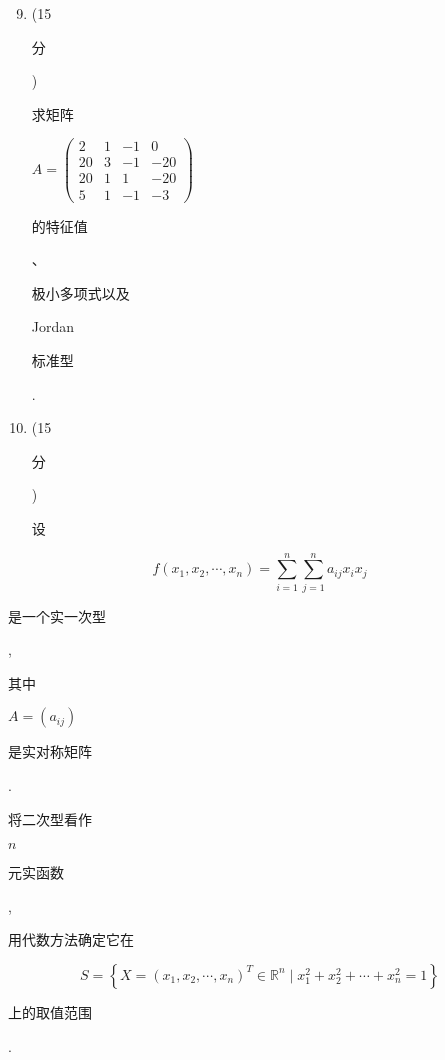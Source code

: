\documentclass[10pt]{article}
\begin{document}
\begin{enumerate}
  \setcounter{enumi}{8}
  \item (15 \begin{CJK}{UTF8}{mj}分\end{CJK}) \begin{CJK}{UTF8}{mj}求矩阵\end{CJK} $A=\left(\begin{array}{cccc}2 & 1 & -1 & 0 \\ 20 & 3 & -1 & -20 \\ 20 & 1 & 1 & -20 \\ 5 & 1 & -1 & -3\end{array}\right)$ \begin{CJK}{UTF8}{mj}的特征值\end{CJK}、\begin{CJK}{UTF8}{mj}极小多项式以及\end{CJK} Jordan \begin{CJK}{UTF8}{mj}标准型\end{CJK}.

  \item (15 \begin{CJK}{UTF8}{mj}分\end{CJK}) \begin{CJK}{UTF8}{mj}设\end{CJK}

\end{enumerate}
$$
f\left(x_{1}, x_{2}, \cdots, x_{n}\right)=\sum_{i=1}^{n} \sum_{j=1}^{n} a_{i j} x_{i} x_{j}
$$
\begin{CJK}{UTF8}{mj}是一个实一次型\end{CJK}, \begin{CJK}{UTF8}{mj}其中\end{CJK} $A=\left(a_{i j}\right)$ \begin{CJK}{UTF8}{mj}是实对称矩阵\end{CJK}. \begin{CJK}{UTF8}{mj}将二次型看作\end{CJK} $n$ \begin{CJK}{UTF8}{mj}元实函数\end{CJK}, \begin{CJK}{UTF8}{mj}用代数方法确定它在\end{CJK}
$$
S=\left\{X=\left(x_{1}, x_{2}, \cdots, x_{n}\right)^{T} \in \mathbb{R}^{n} \mid x_{1}^{2}+x_{2}^{2}+\cdots+x_{n}^{2}=1\right\}
$$
\begin{CJK}{UTF8}{mj}上的取值范围\end{CJK}.
\end{document}
